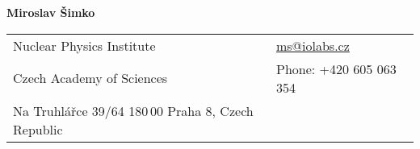 \documentclass[a4paper,11pt,oneside]{article}
\begin{document}

\noindent  \LARGE{\textbf{Miroslav Šimko}}  \\
\vspace{-2ex}
\normalsize


\begin{center}
\begin{tabular}{l l}
 Nuclear Physics Institute   & \hspace{1in} \href{mailto:ms@iolabs.cz}{ms@iolabs.cz} \\
 Czech Academy of Sciences    & \hspace{1in} Phone: +420 605 063 354 \\
 Na Truhlářce 39/64            
 180$\,$00 Praha 8, Czech Republic 
\end{tabular}
\end{center}

\vspace{1em}

\end{document}
